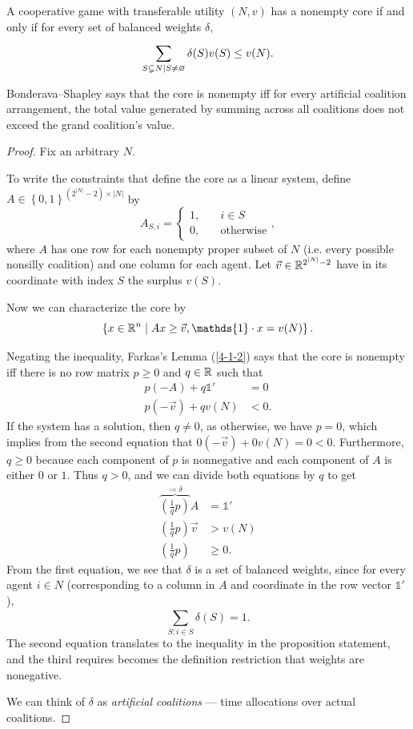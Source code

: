 \begin{theorem}
	A cooperative game with transferable utility $(N,v)$ has a nonempty core if and only if for every set of balanced weights $\delta$, \[
		\sum\limits_{S \subsetneq N \mid S \ne \varnothing}^{} \delta(S) v(S) \le v(N)
	.\] 
\end{theorem}

Bonderava--Shapley says that the core is nonempty iff for every artificial coalition arrangement, the total value generated by summing across all coalitions does not exceed the grand coalition's value.

\begin{proof}
	Fix an arbitrary $N$. 

	To write the constraints that define the core as a linear system, define $A \in \left\{0,1\right\}^{\left( 2^{\left| N \right|} - 2 \right) \times \left| N \right|}$ by \[
		A_{S,i} = \begin{cases}
			1, \quad & i \in S \\
			0, \quad &\text{otherwise}
		\end{cases}
	,\] 
	where $A$ has one row for each nonempty proper subset of $N$ (i.e. every possible nonsilly coalition) and one column for each agent. 
	Let $\vec{v} \in \mathbb{R}^{2^{\left| N \right|} - 2}$ have in its coordinate with index $S$ the surplus $v(S)$.

	Now we can characterize the core by \[
		\left\{x \in \R^n \mid Ax \ge \vec{v}, \mathds{1} \cdot x = v(N)\right\}
	.\] 

	Negating the inequality, Farkas's Lemma (\ref{4-1-2}) says that the core is nonempty iff there is no row matrix $p \ge 0$ and $q \in \mathbb{R}$ such that 
	\begin{align*}
		p\left( -A \right) + q \mathds{1}' &= 0 \\
		p(-\vec{v}) + qv(N) &< 0
	.\end{align*}
	If the system has a solution, then $q\ne 0$, as otherwise, we have $p=0$, which implies from the second equation that $0 (-\vec{v}) + 0 v(N) = 0 < 0$.
	Furthermore, $q \ge 0$ because each component of $p$ is nonnegative and each component of $A$ is either $0$ or $1$. Thus $q > 0$, and we can divide both equations by $q$ to get 
	\begin{align*}
		\overbrace{\left(\frac{1}{q}p\right)}^{\coloneqq \delta}A &= \mathds{1}' \\
		\left( \frac{1}{q}p \right)\vec{v} &> v(N) \\
		\left( \frac{1}{q}p \right) &\ge 0
	.\end{align*}
	From the first equation, we see that $\delta$ is a set of balanced weights, since for every agent $i \in N$ (corresponding to a column in $A$ and coordinate in the row vector $\mathds{1}'$), \[
		\sum\limits_{S: i \in S}^{} \delta(S) = 1
	.\] 
	The second equation translates to the inequality in the proposition statement, and the third requires becomes the definition restriction that weights are nonegative.

	We can think of $\delta$ as \emph{artificial coalitions} --- time allocations over actual coalitions.
\end{proof}

